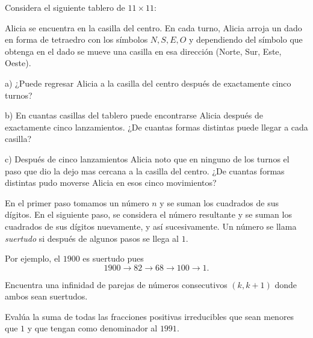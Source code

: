 
\begin{problema}
Considera el siguiente tablero de $11 \times 11$: 
\begin{center}
\end{center}
Alicia se encuentra en la casilla del centro. En cada turno, Alicia arroja un dado en forma de tetraedro con los símbolos $N, S, E, O$ y dependiendo del símbolo que obtenga en el dado se mueve una casilla en esa dirección (Norte, Sur, Este, Oeste).

a) ¿Puede regresar Alicia a la casilla del centro después de exactamente cinco turnos?

b) En cuantas casillas del tablero puede encontrarse Alicia después de exactamente cinco lanzamientos. ¿De cuantas formas distintas puede llegar a cada casilla?

c) Después de cinco lanzamientos Alicia noto que en ninguno de los turnos el paso que dio la dejo mas cercana a la casilla del centro.
¿De cuantas formas distintas pudo moverse Alicia en esos cinco movimientos?
\end{problema}
\vspace{2cm}


\begin{problema}
En el primer paso tomamos un número $n$ y se suman los cuadrados de sus dígitos. En el siguiente paso, se considera el número resultante y se suman los cuadrados de sus dígitos nuevamente, y así sucesivamente. Un número se llama \emph{suertudo} si después de algunos pasos se llega al $1$. 

Por ejemplo, el $1900$ es suertudo pues $$1900 \to 82 \to 68 \to 100 \to 1.$$ 

Encuentra una infinidad de parejas de números consecutivos $(k,k+1)$ donde ambos sean suertudos.
\end{problema}

\begin{problema}
Evalúa la suma de todas las fracciones positivas irreducibles que sean menores que $1$ y que tengan como denominador al $1991$.
\end{problema}

